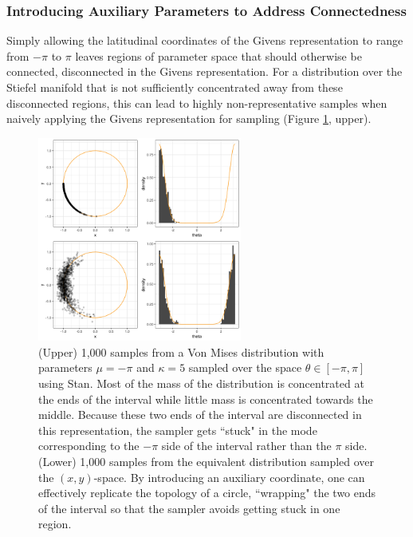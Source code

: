 \documentclass[ba]{imsart}
\numberwithin{equation}{section}
\theoremstyle{plain}
\begin{document}
\subsubsection{Introducing Auxiliary Parameters to Address Connectedness}
\noindent  Simply allowing the latitudinal coordinates of the Givens representation to range from $-\pi$ to $\pi$ leaves regions of parameter space that should otherwise be connected, disconnected in the Givens representation. For a distribution over the Stiefel manifold that is not sufficiently concentrated away from these disconnected regions, this can lead to highly non-representative samples when naively applying the Givens representation for sampling (Figure \ref{fig:donut}, upper).

\begin{figure}[h]
\centering
\vspace{.1in}
\includegraphics[width=0.6\textwidth]{figures/donut.png}
\vspace{.05in}
\caption{(Upper) 1,000 samples from a Von Mises distribution with parameters $\mu = -\pi$ and $\kappa = 5$ sampled over the space $\theta \in [-\pi, \pi]$ using Stan. Most of the mass of the distribution is concentrated at the ends of the interval while little mass is concentrated towards the middle. Because these two ends of the interval are disconnected in this representation, the sampler gets ``stuck" in the mode corresponding to the $-\pi$ side of the interval rather than the $\pi$ side. (Lower) 1,000 samples from the equivalent distribution sampled over the $(x,y)$-space. By introducing an auxiliary coordinate, one can effectively replicate the topology of a circle, ``wrapping" the two ends of the interval so that the sampler avoids getting stuck in one region.}
\label{fig:donut}
\end{figure}
\end{document}
